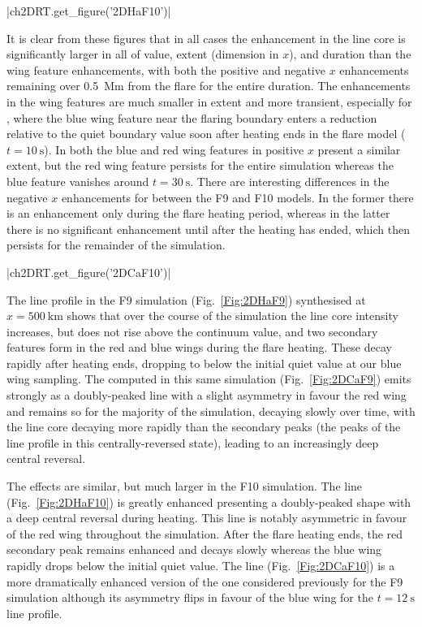 \py[2DRT]|ch2DRT.get_figure('2DHaF10')|

It is clear from these figures that in all cases the enhancement in the line core is significantly larger in all of value, extent (dimension in $x$), and duration than the wing feature enhancements, with both the positive and negative $x$ enhancements remaining over \SI{0.5}{\mega\metre} from the flare for the entire duration.
The enhancements in the wing features are much smaller in extent and more transient, especially for \Ha{}, where the blue wing feature near the flaring boundary enters a reduction relative to the quiet boundary value soon after heating ends in the flare model ($t=\SI{10}{\second}$).
In \CaLine{} both the blue and red wing features in positive $x$ present a similar extent, but the red wing feature persists for the entire simulation whereas the blue feature vanishes around $t=\SI{30}{\second}$.
There are interesting differences in the negative $x$ enhancements for \CaLine{} between the F9 and F10 models.
In the former there is an enhancement only during the flare heating period, whereas in the latter there is no significant enhancement until after the heating has ended, which then persists for the remainder of the simulation.

\py[2DRT]|ch2DRT.get_figure('2DCaF10')|

The \Ha{} line profile in the F9 simulation (Fig.~\ref{Fig:2DHaF9}) synthesised at $x=\SI{500}{\kilo\metre}$ shows that over the course of the simulation the line core intensity increases, but does not rise above the continuum value, and two secondary features form in the red and blue wings during the flare heating.
These decay rapidly after heating ends, dropping to below the initial quiet value at our blue wing sampling.
The \CaLine{} computed in this same simulation (Fig.~\ref{Fig:2DCaF9}) emits strongly as a doubly-peaked line with a slight asymmetry in favour the red wing and remains so for the majority of the simulation, decaying slowly over time, with the line core decaying more rapidly than the secondary peaks (the peaks of the line profile in this centrally-reversed state), leading to an increasingly deep central reversal.

The effects are similar, but much larger in the F10 simulation.
The \Ha{} line (Fig.~\ref{Fig:2DHaF10}) is greatly enhanced presenting a doubly-peaked shape with a deep central reversal during heating.
This line is notably asymmetric in favour of the red wing throughout the simulation.
After the flare heating ends, the red secondary peak remains enhanced and decays slowly whereas the blue wing rapidly drops below the initial quiet value.
The \CaLine{} line (Fig.~\ref{Fig:2DCaF10}) is a more dramatically enhanced version of the one considered previously for the F9 simulation although its asymmetry flips in favour of the blue wing for the $t=\SI{12}{\second}$ line profile.

